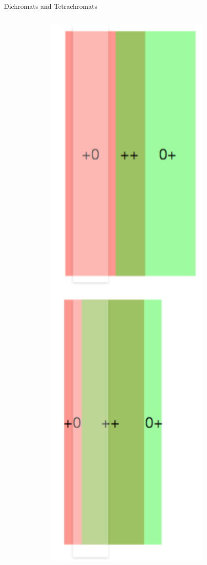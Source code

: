 \documentclass{beamer}
\begin{document}
\begin{frame}{Dichromats and Tetrachromats}
   \begin{columns}
   \begin{column}{0.15\textwidth}
      \includegraphics[width=1.4\textwidth]{figures/redgreenbars2.png}

\end{column}
\end{columns}
\end{frame}
\end{document}
